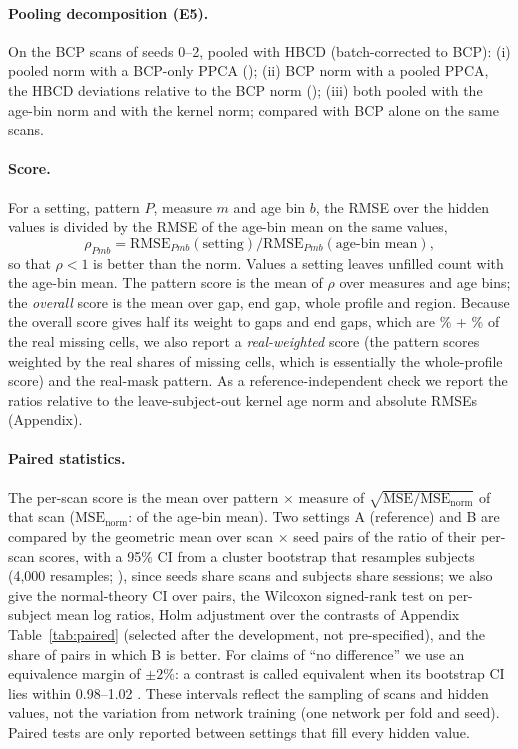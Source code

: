 \documentclass[11pt]{article}
\newcommand{\ratio}{\ensuremath{\rho}}
\begin{document}
\paragraph{Pooling decomposition (E5).} On the BCP scans of seeds 0--2, pooled with HBCD (batch-corrected to BCP):
(i) pooled norm with a BCP-only PPCA (); (ii) BCP norm with a pooled PPCA, the HBCD
deviations relative to the BCP norm (); (iii) both pooled with the age-bin norm and with
the kernel norm; compared with BCP alone on the same scans.

\paragraph{Score.} For a setting, pattern $P$, measure $m$ and age bin $b$, the RMSE over the hidden values is divided by
the RMSE of the age-bin mean on the same values,
\begin{equation}
\ratio_{Pmb}=\mathrm{RMSE}_{Pmb}(\text{setting})/\mathrm{RMSE}_{Pmb}(\text{age-bin mean}),
\end{equation}
so that $\ratio<1$ is better than the norm. Values a setting leaves unfilled count
with the age-bin mean. The pattern score is the mean of $\ratio$ over measures and age bins; the \emph{overall} score is
the mean over gap, end gap, whole profile and region. Because the overall score gives half its weight to gaps and end
gaps, which are \realShareEnd\% + \realShareGap\% of the real missing cells, we also report a \emph{real-weighted} score
(the pattern scores weighted by the real shares of missing cells, which is essentially the whole-profile score) and the
real-mask pattern. As a reference-independent check we report the ratios relative to the leave-subject-out kernel age
norm and absolute RMSEs (Appendix).

\paragraph{Paired statistics.} The per-scan score is the mean over pattern $\times$ measure of
$\sqrt{\mathrm{MSE}/\mathrm{MSE}_{\mathrm{norm}}}$ of that scan ($\mathrm{MSE}_{\mathrm{norm}}$: of the age-bin mean). Two settings A (reference) and B are compared by
the geometric mean over scan $\times$ seed pairs of the ratio of their per-scan scores, with a 95\% CI from a cluster
bootstrap that resamples subjects (4,000 resamples; \citealp{field2007bootstrap}), since seeds share scans and subjects
share sessions; we also give the normal-theory CI over pairs, the Wilcoxon signed-rank test \citep{wilcoxon1945} on
per-subject mean log ratios, Holm adjustment \citep{holm1979} over the \nContrasts{} contrasts of
Appendix Table~\ref{tab:paired} (selected after the development, not pre-specified), and the share of pairs in which B is better.
For claims of ``no difference'' we use an equivalence margin of $\pm2\%$: a contrast is called equivalent when its
bootstrap CI lies within 0.98--1.02 \citep{lakens2017equivalence}. These intervals reflect the sampling of scans and
hidden values, not the variation from network training (one network per fold and seed). Paired tests are only reported
between settings that fill every hidden value.
\end{document}
